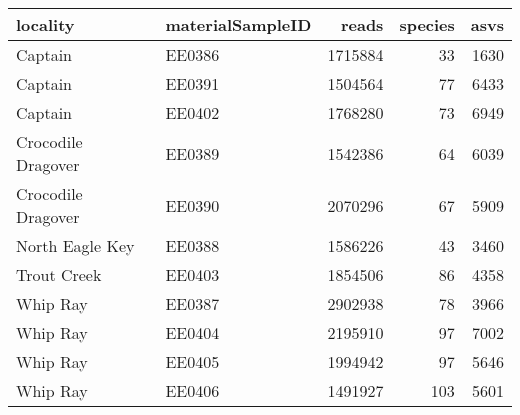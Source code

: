\begin{longtable}{llrrr}
  \hline
locality & materialSampleID & reads & species & asvs \\ 
  \hline
Captain & EE0386 & 1715884 &  33 & 1630 \\ 
  Captain & EE0391 & 1504564 &  77 & 6433 \\ 
  Captain & EE0402 & 1768280 &  73 & 6949 \\ 
  Crocodile Dragover & EE0389 & 1542386 &  64 & 6039 \\ 
  Crocodile Dragover & EE0390 & 2070296 &  67 & 5909 \\ 
  North Eagle Key & EE0388 & 1586226 &  43 & 3460 \\ 
  Trout Creek & EE0403 & 1854506 &  86 & 4358 \\ 
  Whip Ray & EE0387 & 2902938 &  78 & 3966 \\ 
  Whip Ray & EE0404 & 2195910 &  97 & 7002 \\ 
  Whip Ray & EE0405 & 1994942 &  97 & 5646 \\ 
  Whip Ray & EE0406 & 1491927 & 103 & 5601 \\ 
   \hline
\hline
\end{longtable}
